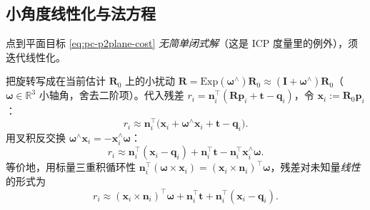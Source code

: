 \subsection{小角度线性化与法方程}
\label{sec:pc-p2plane-lin}

点到平面目标 \cref{eq:pc-p2plane-cost} \emph{无简单闭式解}（这是 ICP 度量里的例外），须迭代线性化\cite{low2004p2plane}。

\begin{derivation}
把旋转写成在当前估计 $\mathbf{R}_0$ 上的小扰动 $\mathbf{R}=\mathrm{Exp}(\boldsymbol{\omega}^\wedge)\mathbf{R}_0\approx(\mathbf{I}+\boldsymbol{\omega}^\wedge)\mathbf{R}_0$（$\boldsymbol{\omega}\in\mathbb{R}^3$ 小轴角，舍去二阶项）。代入残差 $r_i=\mathbf{n}_i^\top(\mathbf{R}\mathbf{p}_i+\mathbf{t}-\mathbf{q}_i)$，令 $\mathbf{x}_i:=\mathbf{R}_0\mathbf{p}_i$：
\begin{equation}
  r_i\approx\mathbf{n}_i^\top\big(\mathbf{x}_i+\boldsymbol{\omega}^\wedge\mathbf{x}_i+\mathbf{t}-\mathbf{q}_i\big).
\end{equation}
用叉积反交换 $\boldsymbol{\omega}^\wedge\mathbf{x}_i=-\mathbf{x}_i^\wedge\boldsymbol{\omega}$：
\begin{equation}
  r_i\approx\mathbf{n}_i^\top(\mathbf{x}_i-\mathbf{q}_i)+\mathbf{n}_i^\top\mathbf{t}-\mathbf{n}_i^\top\mathbf{x}_i^\wedge\boldsymbol{\omega}.
  \label{eq:pc-p2plane-r}
\end{equation}
等价地，用标量三重积循环性 $\mathbf{n}_i^\top(\boldsymbol{\omega}\times\mathbf{x}_i)=(\mathbf{x}_i\times\mathbf{n}_i)^\top\boldsymbol{\omega}$，残差对未知量\emph{线性}的形式为
\begin{equation}
  r_i\approx(\mathbf{x}_i\times\mathbf{n}_i)^\top\boldsymbol{\omega}+\mathbf{n}_i^\top\mathbf{t}+\mathbf{n}_i^\top(\mathbf{x}_i-\mathbf{q}_i).
  \label{eq:pc-p2plane-rlin}
\end{equation}
\end{derivation}


